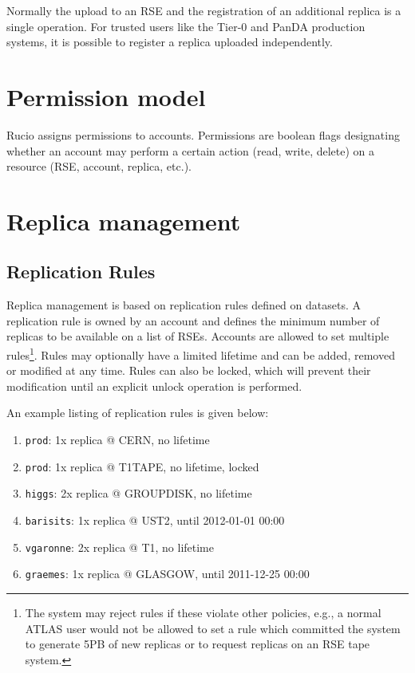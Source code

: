 \documentclass{atlasnote}
\newcommand{\code}[1]{\texttt{#1}}
\begin{document}
Normally the upload to an RSE and the registration of an additional
replica is a single operation. For trusted users like the Tier-0 and
PanDA production systems, it is possible to register a replica
uploaded independently.


\section{Permission model}
\label{overview_Permission_model:permission-model}\label{overview_Permission_model::doc}
Rucio assigns permissions to accounts. Permissions are boolean flags
designating whether an account may perform a certain action (read,
write, delete) on a resource (RSE, account, replica, etc.).


\section{Replica management}
\label{overview_Replica_management:replica-management}\label{overview_Replica_management::doc}

\subsection{Replication Rules}
\label{sec:replication-rules}

Replica management is based on replication rules defined on datasets.
A replication rule is owned by an account and defines the
minimum number of replicas to be available on a list of RSEs. Accounts
are allowed to set multiple rules\footnote{ The system may reject
  rules if these violate other policies, e.g., a normal ATLAS user
  would not be allowed to set a rule which committed the system to
  generate 5PB of new replicas or to request replicas on an RSE tape
  system.  }.  Rules may optionally have a limited lifetime and can be
added, removed or modified at any time. Rules can also be locked,
which will prevent their modification until an explicit unlock
operation is performed.

An example listing of replication rules is given below:
\begin{enumerate}
\item \code{prod}: 1x replica @ CERN, no lifetime
\item \code{prod}: 1x replica @ T1TAPE, no lifetime, locked
\item \code{higgs}: 2x replica @ GROUPDISK, no lifetime
\item \code{barisits}: 1x replica @ UST2, until 2012-01-01 00:00
\item \code{vgaronne}: 2x replica @ T1, no lifetime
\item \code{graemes}: 1x replica @ GLASGOW, until 2011-12-25 00:00
\end{enumerate}
\end{document}
